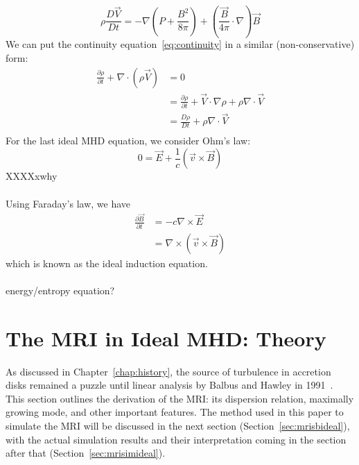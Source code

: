 \begin{equation}
  \rho\frac{D\vec V}{Dt}=-\nabla\left(P+\frac{B^2}{8\pi}\right)+\left(\frac{\vec B}{4\pi}\cdot\nabla\right)\vec B \label{eq:momcons2}
\end{equation}
We can put the continuity equation~\ref{eq:continuity} in a similar (non-conservative) form:
\begin{align}
  \frac{\partial\rho}{\partial t}+\nabla\cdot\left(\rho\vec V\right)&=0\\
  &=\frac{\partial\rho}{\partial t}+\vec V\cdot\nabla\rho+\rho\nabla\cdot\vec V\\
  &=\frac{D\rho}{Dt}+\rho\nabla\cdot\vec V\\
\end{align}
For the last ideal MHD equation, we consider Ohm's law:
\begin{equation}
  0=\vec E+\frac1c(\vec v\times\vec B)
\end{equation}
XXXXxwhy\\
\\Using Faraday's law, we have
\begin{align}
  \frac{\partial\vec B}{\partial t}&=-c\nabla\times\vec E\\
  &=\nabla\times\left(\vec v\times\vec B\right)
\end{align}
which is known as the ideal induction equation.\\
\\
energy/entropy equation? 

\section{The MRI in Ideal MHD: Theory}
As discussed in Chapter~\ref{chap:history}, the source of turbulence in accretion disks remained a puzzle until linear analysis by Balbus and Hawley in 1991~\cite{BH1991}. This section outlines the derivation of the MRI: its dispersion relation, maximally growing mode, and other important features. The method used in this paper to simulate the MRI will be discussed in the next section (Section~\ref{sec:mrisbideal}), with the actual simulation results and their interpretation coming in the section after that (Section~\ref{sec:mrisimideal}).


